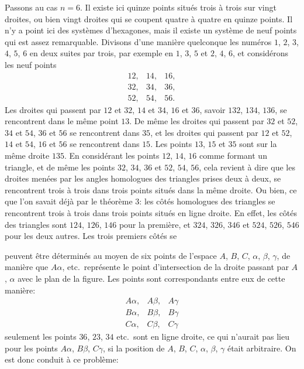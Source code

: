 \documentclass[11pt,a4paper]{book}
\begin{document}
Passons au cas $n = 6$. Il existe ici quinze points situ\'es trois \`a trois sur vingt droites, ou bien vingt droites qui se coupent quatre \`a quatre en quinze points. Il n'y a point ici des syst\`emes d'hexagones, mais il existe un syst\`eme de neuf points qui est assez remarquable. Divisons d'une mani\`ere quelconque les num\'eros $1$, $2$, $3$, $4$, $5$, $6$ en deux suites par trois, par exemple en $1$, $3$, $5$ et $2$, $4$, $6$, et consid\'erons les neuf points
\[
\begin{array}{ccc}
12, & 14, & 16, \\
32, & 34, & 36, \\
52, & 54, & 56.
\end{array}
\]
Les droites qui passent par $12$ et $32$, $14$ et $34$, $16$ et $36$, savoir $132$, $134$, $136$, se rencontrent dans le m\^eme point $13$. De m\^eme les droites qui passent par $32$ et $52$, $34$ et $54$, $36$ et $56$ se rencontrent dans $35$, et les droites qui passent par $12$ et $52$, $14$ et $54$, $16$ et $56$ se rencontrent dans $15$. Les points $13$, $15$ et $35$ sont sur la m\^eme droite $135$. En consid\'erant les points $12$, $14$, $16$ comme formant un triangle, et de m\^eme les points $32$, $34$, $36$ et $52$, $54$, $56$, cela revient \`a dire que les droites men\'ees par les angles homologues des triangles prises deux \`a deux, se rencontrent trois \`a trois dans trois points situ\'es dans la m\^eme droite. Ou bien, ce que l'on savait d\'ej\`a par le th\'eor\`eme 3: les c\^ot\'es homologues des triangles se rencontrent trois \`a trois dans trois points situ\'es en ligne droite. En effet, les c\^ot\'es des triangles sont $124$, $126$, $146$ pour la premi\`ere, et $324$, $326$, $346$ et $524$, $526$, $546$ pour les deux autres. Les trois premiers c\^ot\'es se

\newpage


peuvent \^etre d\'etermin\'es au moyen de six points de l'espace $A$, $B$, $C$, $\alpha$, $\beta$, $\gamma$, de mani\`ere que $A\alpha$, etc.\ repr\'esente le point d'intersection de la droite passant par $A$, $\alpha$ avec le plan de la figure. Les points sont correspondants entre eux de cette mani\`ere:
\[
\begin{array}{ccc}
A\alpha, & A\beta, & A\gamma \\
B\alpha, & B\beta, & B\gamma \\
C\alpha, & C\beta, & C\gamma
\end{array}
\]
seulement les points $36$, $23$, $34$ etc.\ sont en ligne droite, ce qui n'aurait pas lieu pour les points $A\alpha$, $B\beta$, $C\gamma$, si la position de $A$, $B$, $C$, $\alpha$, $\beta$, $\gamma$ \'etait arbitraire. On est donc conduit \`a ce probl\`eme:
\end{document}
